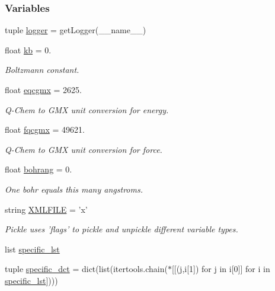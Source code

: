 \subsubsection*{\-Variables}
\begin{DoxyCompactItemize}
\item 
tuple \hyperlink{namespaceforcebalance_1_1nifty_a94fc8d9a0375d86ee16bfe16c896d74c}{logger} = get\-Logger(\-\_\-\-\_\-name\-\_\-\-\_\-)
\item 
float \hyperlink{namespaceforcebalance_1_1nifty_aace36d3e1ed8cd2ead67d53ec177063f}{kb} = 0.
\begin{DoxyCompactList}\small\item\em \-Boltzmann constant. \end{DoxyCompactList}\item 
float \hyperlink{namespaceforcebalance_1_1nifty_a2b5a159b5e297e92699a10b05fa8911f}{eqcgmx} = 2625.
\begin{DoxyCompactList}\small\item\em \-Q-\/\-Chem to \-G\-M\-X unit conversion for energy. \end{DoxyCompactList}\item 
float \hyperlink{namespaceforcebalance_1_1nifty_a7ad933fe53e048142852569b9a288f2e}{fqcgmx} = 49621.
\begin{DoxyCompactList}\small\item\em \-Q-\/\-Chem to \-G\-M\-X unit conversion for force. \end{DoxyCompactList}\item 
float \hyperlink{namespaceforcebalance_1_1nifty_a9d8921e29d14572a15a6bd1755d240d4}{bohrang} = 0.
\begin{DoxyCompactList}\small\item\em \-One bohr equals this many angstroms. \end{DoxyCompactList}\item 
string \hyperlink{namespaceforcebalance_1_1nifty_a89b76b7b16a8e2533c6599fa9ff8cff6}{\-X\-M\-L\-F\-I\-L\-E} = 'x'
\begin{DoxyCompactList}\small\item\em \-Pickle uses 'flags' to pickle and unpickle different variable types. \end{DoxyCompactList}\item 
list \hyperlink{namespaceforcebalance_1_1nifty_a451beef98f339cc46bf19b8b4b9dd755}{specific\-\_\-lst}
\item 
tuple \hyperlink{namespaceforcebalance_1_1nifty_a41091c8b7861352d9cba164b15d0d022}{specific\-\_\-dct} = dict(list(itertools.\-chain($\ast$\mbox{[}\mbox{[}(j,i\mbox{[}1\mbox{]}) for j in i\mbox{[}0\mbox{]}\mbox{]} for i in \hyperlink{namespaceforcebalance_1_1nifty_a451beef98f339cc46bf19b8b4b9dd755}{specific\-\_\-lst}\mbox{]})))
\end{DoxyCompactItemize}


